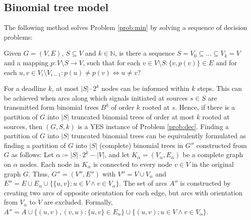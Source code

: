 \subsection{Binomial tree model}

The following method solves Problem \ref{prob:min} by solving a sequence of decision problems:
\begin{problem}
\label{prob:dec}
Given $G=(V,E)$, $S\subseteq V$ and $k\in \mathbb{N}$, is there a sequence $S=V_0\subseteq\dots\subseteq V_k=V$ 
and a mapping $p:V\setminus S\to V$, such that for each $v\in V\setminus S:\{v,p(v)\}\in E$ and for each  $u,v\in V_i\setminus V_{i-1}: p(u)\neq p(v)\Leftrightarrow u\neq v$?
\end{problem}
For a deadline $k$, at most $|S|\cdot 2^k$ nodes can be informed within $k$ steps. 
This can be achieved when arcs along which signals initiated at sources $s\in S$ are transmitted form binomial trees $B^k$ of order $k$ rooted at $s$.
Hence, if there is a partition of $G$ into $|S|$ truncated binomial trees of order at most $k$ rooted at sources, then $(G,S,k)$ is a YES instance of Problem \ref{prob:dec}.
Finding a partition of $G$ into $|S|$ truncated binomial trees can be equivalently formulated as finding a partition of $G$ into $|S|$ (complete) binomial trees in $G''$ constructed from $G$ as follows:
Let $\alpha\coloneqq |S|\cdot 2^k-|V|$, and let $K_\alpha=(V_\alpha,E_\alpha)$ be a complete graph on $\alpha$ nodes.
Each node in $K_\alpha$ is connected to every node $v\in V$ in the original graph $G$.
Thus, $G''=(V'',E'')$ with $V''=V\cup V_\alpha$ and $E''=E\cup E_\alpha\cup \{\{u,v\}: u\in V \wedge v\in V_\alpha\}$.
The set of arcs $A''$ is constructed by creating two arcs of opposite orientation for each edge, but arcs with orientation from $V_\alpha$ to $V$ are excluded. 
Formally, $A''=A\cup\{(u,v),(v,u): \{u,v\}\in E_\alpha\}\cup\{(u,v):u\in V \wedge v\in V_\alpha\}$.

